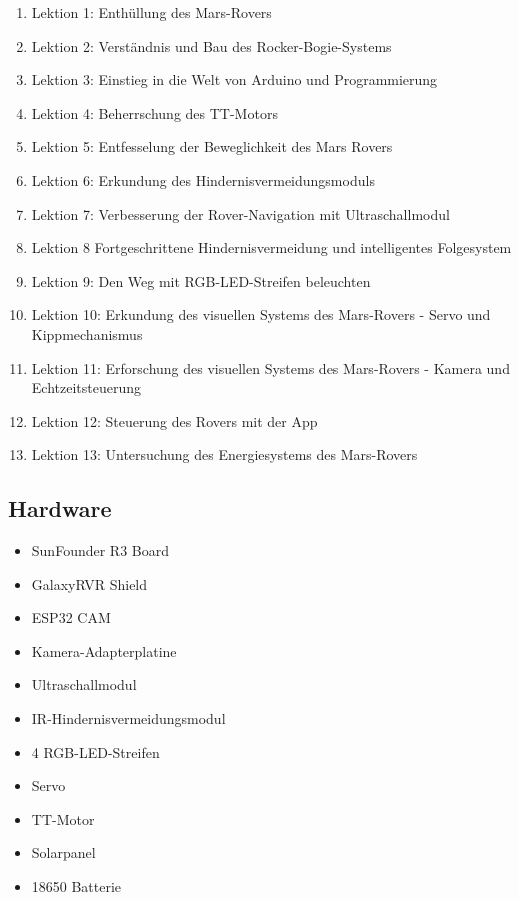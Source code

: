 \documentclass{vorlage-design-main}
\begin{document}
\begin{enumerate}
\def\labelenumi{\arabic{enumi}.}

\item
  Lektion 1: Enthüllung des Mars-Rovers
\item
  Lektion 2: Verständnis und Bau des Rocker-Bogie-Systems
\item
  Lektion 3: Einstieg in die Welt von Arduino und Programmierung
\item
  Lektion 4: Beherrschung des TT-Motors
\item
  Lektion 5: Entfesselung der Beweglichkeit des Mars Rovers
\item
  Lektion 6: Erkundung des Hindernisvermeidungsmoduls
\item
  Lektion 7: Verbesserung der Rover-Navigation mit Ultraschallmodul
\item
  Lektion 8 Fortgeschrittene Hindernisvermeidung und intelligentes
  Folgesystem
\item
  Lektion 9: Den Weg mit RGB-LED-Streifen beleuchten
\item
  Lektion 10: Erkundung des visuellen Systems des Mars-Rovers - Servo
  und Kippmechanismus
\item
  Lektion 11: Erforschung des visuellen Systems des Mars-Rovers - Kamera
  und Echtzeitsteuerung
\item
  Lektion 12: Steuerung des Rovers mit der App
\item
  Lektion 13: Untersuchung des Energiesystems des Mars-Rovers
\end{enumerate}

\hypertarget{hardware}{%
\subsection{Hardware}\label{hardware}}

\begin{itemize}

\item
  SunFounder R3 Board
\item
  GalaxyRVR Shield
\item
  ESP32 CAM
\item
  Kamera-Adapterplatine
\item
  Ultraschallmodul
\item
  IR-Hindernisvermeidungsmodul
\item
  4 RGB-LED-Streifen
\item
  Servo
\item
  TT-Motor
\item
  Solarpanel
\item
  18650 Batterie
\end{itemize}
\end{document}
